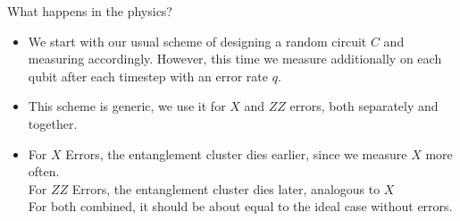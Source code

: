\par{What happens in the physics?}
\begin{itemize}
  \item We start with our usual scheme of designing a random circuit $C$ and
    measuring accordingly. However, this time we measure additionally on
    each qubit after each timestep with an error rate $q$.
  \item This scheme is generic, we use it for $X$ and $ZZ$ errors, both
    separately and together. 
  \item For $X$ Errors, the entanglement cluster dies earlier, since we measure
    $X$ more often.\\
    For $ZZ$ Errors, the entanglement cluster dies later, analogous to $X$\\
    For both combined, it should be about equal to the ideal case without
    errors.
\end{itemize}

